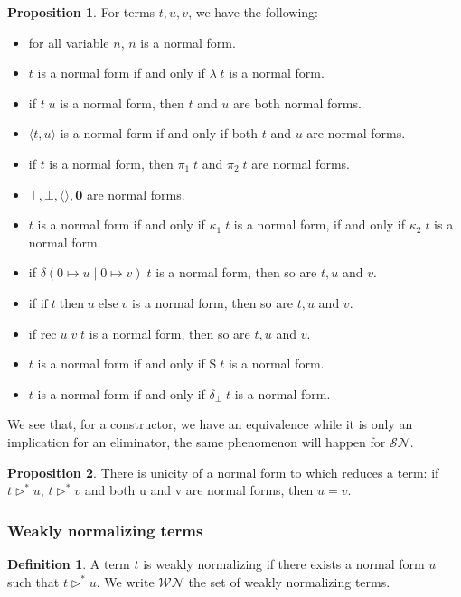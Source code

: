 \documentclass{article}
\newcommand{\SN}[0]{\mathcal{SN}}
\newcommand{\ife}[3]{\mathrm{if}\;#1\;\mathrm{then}\;#2\;\mathrm{else}\;#3}
\newcommand{\bO}[0]{\boldsymbol{0}}
\newcommand{\Ss}[0]{\mathrm{S}}
\newcommand{\rec}[0]{\mathrm{rec}}
\newcommand{\Tt}[0]{\top}
\newcommand{\Ff}[0]{\bot}
\newcommand{\deltacase}[3]{\delta(0\mapsto #1\mid 0 \mapsto #2)\;#3}
\theoremstyle{definition}
\newtheorem{defi}{Definition}
\newtheorem{prop}{Proposition}[subsection]
\begin{document}
\begin{prop}
    For terms $t,u,v$, we have the following:
    \begin{itemize}
        \item for all variable $n$, $n$ is a normal form.
        \item $t$ is a normal form if and only if $\lambda\;t$ is a normal form.
        \item if $t\;u$ is a normal form, then $t$ and $u$ are both normal forms.
        \item $\langle t,u\rangle$ is a normal form if and only if both $t$ and $u$ are normal forms.
        \item if $t$ is a normal form, then $\pi_1\;t$ and $\pi_2\;t$ are normal forms.
        \item $\Tt,\Ff,\langle\rangle,\bO$ are normal forms.
        \item $t$ is a normal form if and only if $\kappa_1\;t$ is a normal form, if and only if $\kappa_2\;t$
        is a normal form.
        \item if $\deltacase{u}{v}{t}$ is a normal form, then so are $t,u$ and $v$.
        \item if $\ife{t}{u}{v}$ is a normal form, then so are $t,u$ and $v$.
        \item if $\rec\;u\;v\;t$ is a normal form, then so are $t,u$ and $v$.
        \item $t$ is a normal form if and only if $\Ss\;t$ is a normal form.
        \item $t$ is a normal form if and only if $\delta_\bot\;t$ is a normal form.
    \end{itemize}
\end{prop}

We see that, for a constructor, we have an equivalence while it is only an implication for an eliminator, the
same phenomenon will happen for $\SN$.

\begin{prop}
    There is unicity of a normal form to which reduces a term: if $t\rhd^* u$, $t\rhd^* v$ and both u and v
    are normal forms, then $u = v$.
\end{prop}

\subsubsection{Weakly normalizing terms}

\begin{defi}
    A term $t$ is weakly normalizing if there exists a normal form $u$ such that $t\rhd^* u$. We write
    $\mathcal{WN}$ the set of weakly normalizing terms.
\end{defi}
\end{document}
